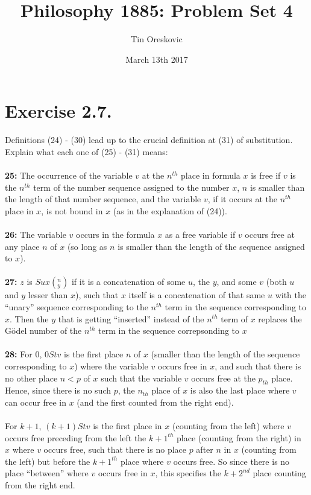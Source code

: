 \documentclass{article}
\title{Philosophy 1885: Problem Set 4}
\author{Tin Oreskovic}
\date{March 13th 2017}
\begin{document}
\maketitle
\section*{Exercise 2.7.}
Definitions (24) - (30) lead up to the crucial definition at (31) of substitution. Explain what each one of (25) - (31) means:\\\\
\textbf{25:} The occurrence of the variable $v$ at the $n^{th}$ place in formula $x$ is free if $v$ is the $n^{th}$ term of the number sequence assigned to the number $x$, $n$ is smaller than the length of that number sequence, and the variable $v$, if it occurs at the $n^{th}$ place in $x$, is not bound in $x$ (as in the explanation of (24)).  \\\\
\textbf{26:} The variable $v$ occurs in the formula $x$ as a free variable if $v$ occurs free at any place $n$ of $x$ (so long as $n$ is smaller than the length of the sequence assigned to $x$).\\\\
\textbf{27:} $z$ is $Su x (^{n}_{y})$ if it is a concatenation of some $u$, the $y$, and some $v$ (both $u$ and $y$ lesser than $x$), such that $x$ itself is a concatenation of that same $u$ with the ``unary'' sequence corresponding to the $n^{th}$ term in the sequence corresponding to $x$. Then the $y$ that is getting ``inserted'' instead of the $n^{th}$ term of $x$ replaces the G\"odel number of the $n^{th}$ term in the sequence correpsonding to $x$\\\\
\textbf{28:} For $0$, $0Stv$ is the first place $n$ of $x$ (smaller than the length of the sequence corresponding to $x$) where the variable $v$ occurs free in $x$, and such that there is no other place $n<p$ of $x$ such that the variable $v$ occurs free at the $p_{th}$ place. Hence, since there is no such $p$, the $n_{th}$ place of $x$ is also the last place where $v$ can occur free in $x$ (and the first counted from the right end).\\\\
For $k+1$, $(k+1)St v$ is the first place in $x$ (counting from the left) where $v$ occurs free preceding from the left the $k+1^{th}$ place (counting from the right) in $x$ where $v$ occurs free, such that there is no place $p$ after $n$ in $x$ (counting from the left) but before the $k+1^{th}$ place where $v$ occurs free. So since there is no place ``between'' where $v$ occurs free in $x$, this specifies the $k+2^{nd}$ place counting from the right end.\\\\\\
\end{document}
